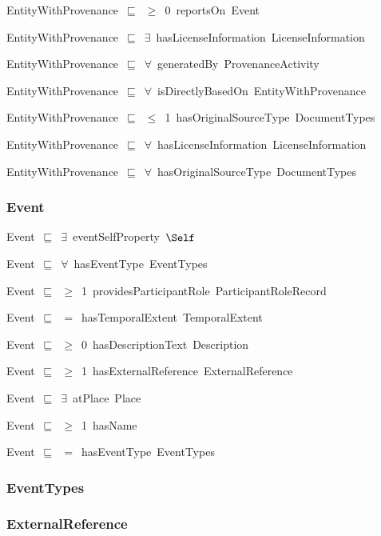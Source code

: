 \documentclass{article}
\begin{document}
EntityWithProvenance~\ensuremath{\sqsubseteq}~\ensuremath{\geq}~0~reportsOn~Event~

EntityWithProvenance~\ensuremath{\sqsubseteq}~\ensuremath{\exists}~hasLicenseInformation~LicenseInformation~

EntityWithProvenance~\ensuremath{\sqsubseteq}~\ensuremath{\forall}~generatedBy~ProvenanceActivity~

EntityWithProvenance~\ensuremath{\sqsubseteq}~\ensuremath{\forall}~isDirectlyBasedOn~EntityWithProvenance~

EntityWithProvenance~\ensuremath{\sqsubseteq}~\ensuremath{\leq}~1~hasOriginalSourceType~DocumentTypes~

EntityWithProvenance~\ensuremath{\sqsubseteq}~\ensuremath{\forall}~hasLicenseInformation~LicenseInformation~

EntityWithProvenance~\ensuremath{\sqsubseteq}~\ensuremath{\forall}~hasOriginalSourceType~DocumentTypes~

\subsubsection*{Event}

Event~\ensuremath{\sqsubseteq}~\ensuremath{\exists}~eventSelfProperty~\ensuremath{\Self}~

Event~\ensuremath{\sqsubseteq}~\ensuremath{\forall}~hasEventType~EventTypes~

Event~\ensuremath{\sqsubseteq}~\ensuremath{\geq}~1~providesParticipantRole~ParticipantRoleRecord~

Event~\ensuremath{\sqsubseteq}~\ensuremath{=}~hasTemporalExtent~TemporalExtent~

Event~\ensuremath{\sqsubseteq}~\ensuremath{\geq}~0~hasDescriptionText~Description~

Event~\ensuremath{\sqsubseteq}~\ensuremath{\geq}~1~hasExternalReference~ExternalReference~

Event~\ensuremath{\sqsubseteq}~\ensuremath{\exists}~atPlace~Place~

Event~\ensuremath{\sqsubseteq}~\ensuremath{\geq}~1~hasName~

Event~\ensuremath{\sqsubseteq}~\ensuremath{=}~hasEventType~EventTypes~

\subsubsection*{EventTypes}

\subsubsection*{ExternalReference}
\end{document}
